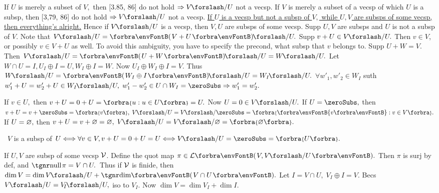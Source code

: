 \BulletPointX\NoteFor{[3.79, 3.83]}\TextB{}
If $U$ is merely a subset of $V,$ then [3.85, 86] do not hold $\Rightarrow V\XSlash U$ not a vecsp.\TextB{}
If $V$ is merely a subset of a vecsp of which $U$ is a subsp, then [3,79, 86] do not hold $\Rightarrow V\XSlash U$ not a vecsp.\TextB{}
\uline{If $U$ is a vecsp but not a subsp of $V,$ while $U,V$ are subsps of some vecsp, then everything's alright.}\TextB{}
Hence if $V\XSlash U$ is a vecsp, then $V,U$ are subsps of some vecsp.\TextB{}
\AComm Supp $U,V$ are subsps and $U$ is not a subsp of $V.$ Note that $V\XSlash U=\Par{V+U}\XSlash U.$\TextB{}
Supp $v+U\in V\XSlash U.$ Then $v\in V$, or possibly $v\in V+U$ as well. To avoid this ambiguity,\TextB{}
you have to specify the precond, what subsp that $v$ belongs to.\TextB{\vspace{2pt}}
\AExa Supp $U+W=V.$ Then $V\XSlash U=\Par{U+W}\XSlash U=W\XSlash U.$ Let $W\cap U=I,U_I\oplus I=U,W_I\oplus I=W.$\parExa{\IndentB}
Now $U_I\oplus W_I\oplus I=V.$ Thus $W\XSlash U=\Par{W_I\oplus I}\XSlash U=W_I\XSlash U.$\parExa{\IndentB}
$\forall w'_1,w'_2\in W_I$ suth $w'_1+U=w'_2+U\in W_I\XSlash U,\;w'_1-w'_2\in U\cap W_I=\zeroSubs\Rightarrow w'_1=w'_2.$\par\vspace{4pt}
\;\;If $v\in U,$ then $v+U=0+U=\Bra{u:u\in U}=U.$ Now $U=0\in V\XSlash U.$\TextB{}
If $U=\zeroSubs,$ then $v+U=v+\zeroSubs=\Bra{v},\;V\XSlash U=V\XSlash\zeroSubs=\Bra{\Bra[\envFontB]{v}:v\in V}.$\TextB{}
If $U=\varnothing,$ then $v+U=v+\emptySet=\emptySet,\;V\XSlash U=V\XSlash\emptySet=\Bra{\emptySet}.$\par\vspace{2pt}
\BulletPointX{}\,\,\,$V$ is a subsp of $U\Longleftrightarrow\forall v\in V,v+U=0+U=U\Longleftrightarrow V\XSlash U=\zeroSubs=\Bra{U}.$
\SepLine

\BulletPointX\NoteForSmall{[3.88]}\;\;If $U,V$ are subsp of some vecsp $\mathcal{V}$. Define the quot map $\pi\in\Lm{V,V\XSlash U}.$\TextB{}
Then $\pi$ is surj by def, and $\null\pi=V\cap U.$ \,Thus if $\mathcal{V}$ is finide, then $\dim V=\dim V\XSlash U+\Dim\Par{V\cap U}.$\TextB{}
\Or Let $I=V\cap U,\;V_{\!I}\oplus I=V.$ Becs $V\XSlash U=V_{\!I}\XSlash U,$ iso to $V_{\!I}.$ Now $\dim V=\dim V_{\!I}+\dim I.$
\SepLine

